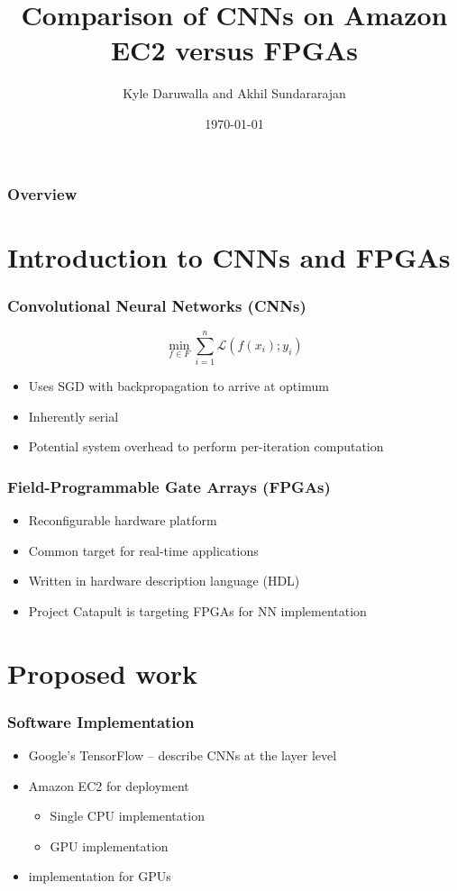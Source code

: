 \documentclass{beamer}
\title[ECE 901 Proposal Presentation]{Comparison of CNNs on Amazon EC2 versus FPGAs} %
\author{Kyle Daruwalla and Akhil Sundararajan}
\institute[UW-Madison]{ECE 901 Fall 2016}
\date{\today}
\begin{document}
\begin{frame}
	\titlepage
\end{frame}

\begin{frame}
	\frametitle{Overview}
	\tableofcontents
\end{frame}


\section{Introduction to CNNs and FPGAs}
\begin{frame}
	\frametitle{Convolutional Neural Networks (CNNs)}
	\begin{equation}
		\min_{f\in F}\sum_{i=1}^n \mathcal{L}(f(x_i);y_i)
		\label{eq:erm}
	\end{equation}
	\begin{itemize}
		\item Uses SGD with backpropagation to arrive at optimum
		\item Inherently serial
		\item Potential system overhead to perform per-iteration computation
	\end{itemize}
\end{frame}

\begin{frame}
	\frametitle{Field-Programmable Gate Arrays (FPGAs)}
	\begin{itemize}
		\item Reconfigurable hardware platform
		\item Common target for real-time applications
		\item Written in hardware description language (HDL)
		\item Project Catapult is targeting FPGAs for NN implementation
	\end{itemize}
\end{frame}

\section{Proposed work}
\begin{frame}
	\frametitle{Software Implementation}
	\begin{itemize}
		\item Google's TensorFlow -- describe CNNs at the layer level
		\item Amazon EC2 for deployment
		\begin{itemize}
			\item Single CPU implementation
			\item GPU implementation
		\end{itemize}
		\item {} implementation for GPUs
	\end{itemize}
\end{frame}
\end{document}
